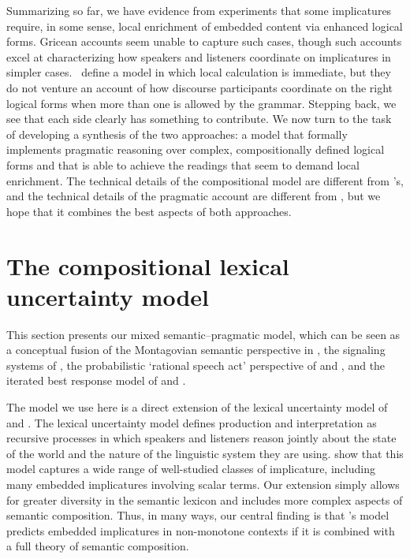 \documentclass[leqno,12pt]{article}
\begin{document}
Summarizing so far, we have evidence from
 experiments that some implicatures
require, in some sense, local enrichment of embedded content via
enhanced logical forms. Gricean accounts seem unable to capture such
cases, though such accounts excel at characterizing how speakers and
listeners coordinate on implicatures in simpler cases. \CFS\ define a
model in which local calculation is immediate, but they do not venture
an account of how discourse participants coordinate on the right
logical forms when more than one is allowed by the grammar. Stepping
back, we see that each side clearly has something to contribute. We
now turn to the task of developing a synthesis of the two approaches:
a model that formally implements pragmatic reasoning over complex,
compositionally defined logical forms and that is able to achieve the
readings that seem to demand local enrichment. The technical details
of the compositional model are different from \CFS's, and the
technical details of the pragmatic account are different from
\citeauthor{Grice75}, but we hope that it combines the best aspects of
both approaches.


\section{The compositional lexical uncertainty model}\label{sec:model}


This section presents our mixed semantic--pragmatic model, which can
be seen as a conceptual fusion of the Montagovian semantic perspective
in \citet{Lewis70GS}, the signaling systems of \citet{Lewis69}, the
probabilistic `rational speech act' perspective of
\citet{Frank:Goodman:2012} and \citet{Goodman:Stuhlmuller:2013}, and
the iterated best response model of \citet{Jaeger:2007,Jaeger:2011}
and \citet{Franke09DISS}.

The model we use here is a direct extension of the lexical uncertainty model of
\citet{Bergen:Goodman:Levy:2012} and
\citet{Bergen:Levy:Goodman:2014}. The lexical uncertainty model
defines 
production and interpretation as recursive processes in
which speakers and listeners reason jointly about the state of the
world and the nature of the linguistic system they are
using. \citeauthor{Bergen:Levy:Goodman:2014} show that this model
captures a wide range of well-studied classes of implicature,
including many embedded implicatures involving scalar terms. Our
extension simply allows for greater diversity in the semantic lexicon
and includes more complex aspects of semantic composition. Thus, in
many ways, our central finding is that
\citeauthor{Bergen:Levy:Goodman:2014}'s model predicts embedded
implicatures in non-monotone contexts if it is combined with a full
theory of semantic composition.
\end{document}
